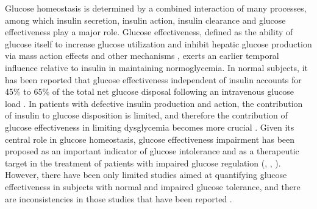 \documentclass[utf8]{frontiersSCNS} %
\begin{document}
Glucose homeostasis is determined by a combined interaction of many processes, among which insulin secretion, insulin action, insulin clearance and glucose effectiveness play a major role. Glucose effectiveness, defined as the ability of glucose itself to increase glucose utilization and inhibit hepatic glucose production via mass action effects and other mechanisms \citep{Dube2015}, exerts an earlier temporal influence relative to insulin in maintaining normoglycemia. In normal subjects, it has been reported that glucose effectiveness independent of insulin accounts for 45\% to 65\% of the total net glucose disposal following an intravenous glucose load \citep{Alford_2018}. In patients with defective insulin production and action, the contribution of insulin to glucose disposition is limited, and therefore the contribution of glucose effectiveness in limiting dysglycemia becomes more crucial \citep{Dube2015}. Given its central role in glucose homeostasis, glucose effectiveness impairment has been proposed as an important indicator of glucose intolerance and as a therapeutic target in the treatment of patients with impaired glucose regulation (\citet{basu_2009}, \citet{pau_2014}, \citet{Alford_2018}). However, there have been only limited studies aimed at quantifying glucose effectiveness in subjects with normal and impaired glucose tolerance, and there are inconsistencies in those studies that have been reported \citep{Dube2015}.
\end{document}
